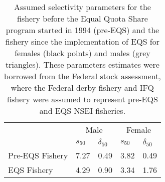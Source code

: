\documentclass[
]{article}
\begin{document}
\begin{longtable}[t]{lllll}
\caption{\label{tab:fedsel}Assumed selectivity parameters for the fishery before the Equal Quota Share program started in 1994 (pre-EQS) and the fishery since the implementation of EQS for females (black points) and males (grey triangles). These parameters estimates were borrowed from the Federal stock assessment, where the Federal derby fishery and IFQ fishery were assumed to represent pre-EQS and EQS NSEI fisheries.}\\
\toprule
\multicolumn{1}{c}{ } & \multicolumn{2}{c}{Male} & \multicolumn{2}{c}{Female} \\
\cmidrule(l{3pt}r{3pt}){2-3} \cmidrule(l{3pt}r{3pt}){4-5}
 & $s_{50}$ & $\delta_{50}$ & $s_{50}$ & $\delta_{50}$\\
\midrule
Pre-EQS Fishery & 7.27 & 0.49 & 3.82 & 0.49\\
EQS Fishery & 4.29 & 0.90 & 3.34 & 1.76\\
\bottomrule
\end{longtable}
\newpage

\newpage
\end{document}
